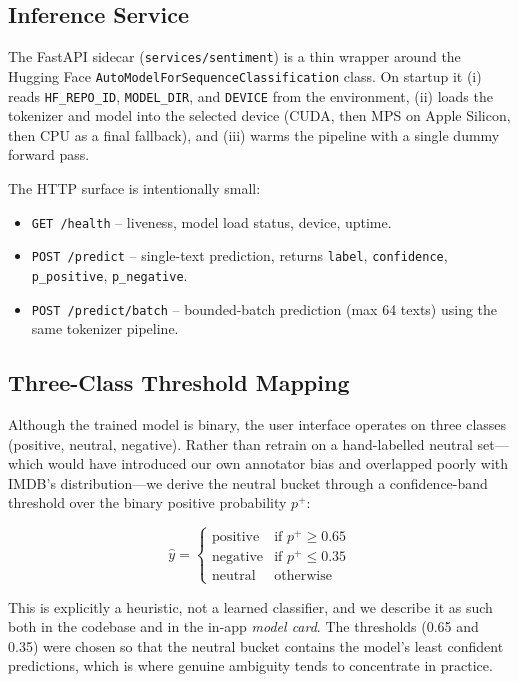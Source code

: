 \documentclass[11pt, a4paper]{article}
\begin{document}
\subsection{Inference Service}

The FastAPI sidecar (\texttt{services/sentiment}) is a thin wrapper around the Hugging Face \texttt{AutoModelForSequenceClassification} class. On startup it (i) reads \texttt{HF\_REPO\_ID}, \texttt{MODEL\_DIR}, and \texttt{DEVICE} from the environment, (ii) loads the tokenizer and model into the selected device (CUDA, then MPS on Apple Silicon, then CPU as a final fallback), and (iii) warms the pipeline with a single dummy forward pass.

The HTTP surface is intentionally small:

\begin{itemize}[leftmargin=1.4em, itemsep=2pt, topsep=4pt]
  \item \texttt{GET /health} -- liveness, model load status, device, uptime.
  \item \texttt{POST /predict} -- single-text prediction, returns \texttt{label}, \texttt{confidence}, \texttt{p\_positive}, \texttt{p\_negative}.
  \item \texttt{POST /predict/batch} -- bounded-batch prediction (max 64 texts) using the same tokenizer pipeline.
\end{itemize}

\subsection{Three-Class Threshold Mapping}

Although the trained model is binary, the user interface operates on three classes (positive, neutral, negative). Rather than retrain on a hand-labelled neutral set---which would have introduced our own annotator bias and overlapped poorly with IMDB's distribution---we derive the neutral bucket through a confidence-band threshold over the binary positive probability $p^{+}$:

\begin{equation}
\hat{y} =
\begin{cases}
\text{positive} & \text{if } p^{+} \geq 0.65 \\
\text{negative} & \text{if } p^{+} \leq 0.35 \\
\text{neutral}  & \text{otherwise}
\end{cases}
\end{equation}

This is explicitly a heuristic, not a learned classifier, and we describe it as such both in the codebase and in the in-app \emph{model card}. The thresholds (0.65 and 0.35) were chosen so that the neutral bucket contains the model's least confident predictions, which is where genuine ambiguity tends to concentrate in practice.
\end{document}
